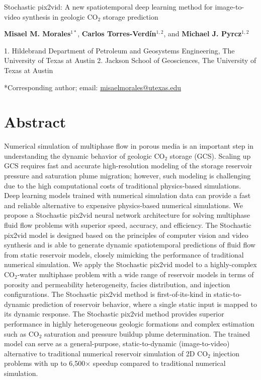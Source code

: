 \documentclass[10pt, twoside]{article}
\begin{document}
\doublespacing

\begin{center}
    {\huge Stochastic pix2vid: A new spatiotemporal deep learning method for image-to-video synthesis in geologic CO$_2$ storage prediction}
    \vspace{5mm}
    
    \textbf{Misael M. Morales$^{1*}$}, 
    \textbf{Carlos Torres-Verd\'in$^{1,2}$}, and
    \textbf{Michael J. Pyrcz$^{1,2}$}
\end{center}

\begin{flushleft}
    1. Hildebrand Department of Petroleum and Geosystems Engineering, The University of Texas at Austin
    2. Jackson School of Geosciences, The University of Texas at Austin
    
    *Corresponding author; email: \url{misaelmorales@utexas.edu}
\end{flushleft}

\section*{\textbf{Abstract}}
Numerical simulation of multiphase flow in porous media is an important step in understanding the dynamic behavior of geologic CO$_2$ storage (GCS). Scaling up GCS requires fast and accurate high-resolution modeling of the storage reservoir pressure and saturation plume migration; however, such modeling is challenging due to the high computational costs of traditional physics-based simulations. Deep learning models trained with numerical simulation data can provide a fast and reliable alternative to expensive physics-based numerical simulations. We propose a Stochastic pix2vid neural network architecture for solving multiphase fluid flow problems with superior speed, accuracy, and efficiency. The Stochastic pix2vid model is designed based on the principles of computer vision and video synthesis and is able to generate dynamic spatiotemporal predictions of fluid flow from static reservoir models, closely mimicking the performance of traditional numerical simulation. We apply the Stochastic pix2vid model to a highly-complex CO$_2$-water multiphase problem with a wide range of reservoir models in terms of porosity and permeability heterogeneity, facies distribution, and injection configurations. The Stochastic pix2vid method is first-of-its-kind in static-to-dynamic prediction of reservoir behavior, where a single static input is mapped to its dynamic response. The Stochastic pix2vid method provides superior performance in highly heterogeneous geologic formations and complex estimation such as CO$_2$ saturation and pressure buildup plume determination. The trained model can serve as a general-purpose, static-to-dynamic (image-to-video) alternative to traditional numerical reservoir simulation of 2D CO$_2$ injection problems with up to 6,500$\times$ speedup compared to traditional numerical simulation.
\end{document}
